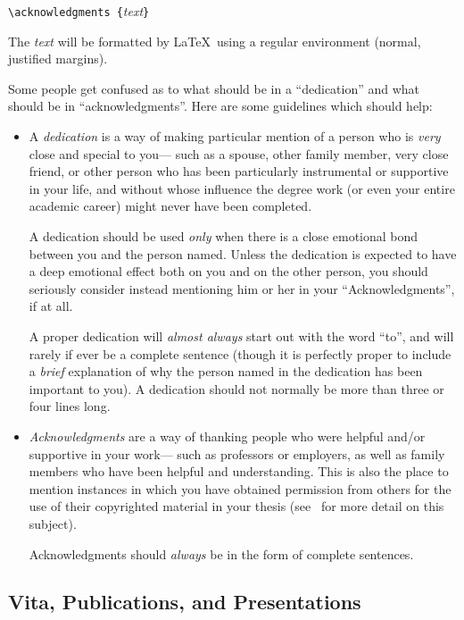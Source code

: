 \begin {center}
\verb+\acknowledgments {+{\sl text\/}\verb+}+
\end {center}

The {\sl text} will be formatted by \LaTeX\ using a regular environment
(normal, justified margins).

Some people get confused as to what should be in a ``dedication'' and
what should be in ``acknowledgments''.
Here are some guidelines which should help:

\begin {itemize}

\item
A {\em dedication\/} is a way of making particular mention
of a person who is {\em very\/} close and special to you---%
such as a spouse, other family member, very close friend,
or other person who has been particularly instrumental
or supportive in your life,
and without whose influence the degree work
(or even your entire academic career)
might never have been completed.

A dedication should be used {\em only\/}
when there is a close emotional bond
between you and the person named.
Unless the dedication is expected to
have a deep emotional effect both on you and on the other person,
you should seriously consider instead
mentioning him or her in your ``Acknowledgments'',
if at all.

A proper dedication will {\em almost always\/}
start out with the word ``to'',
and will rarely if ever be a complete sentence
(though it is perfectly proper to include
a {\em brief\/} explanation of why the person named
in the dedication has been important to you).
A dedication should not normally be
more than three or four lines long.

\item
{\em Acknowledgments\/} are a way of thanking people
who were helpful and/or supportive in your work---%
such as professors or employers,
as well as family members who have been helpful and understanding.
This is also the place to mention instances
in which you have obtained permission from others
for the use of their copyrighted material in your thesis
(see \regs\ for more detail on this subject).

Acknowledgments should {\em always\/}
be in the form of complete sentences.

\end {itemize}

\subsection {Vita, Publications, and Presentations}

